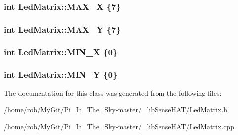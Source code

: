 \subsubsection[{\texorpdfstring{M\+A\+X\+\_\+X}{MAX_X}}]{ int Led\+Matrix\+::\+M\+A\+X\+\_\+X \{7\}\hspace{0.3cm}{\ttfamily [static]}}\hypertarget{class_led_matrix_a6da341535a246a5395b0a46569618830}{}\label{class_led_matrix_a6da341535a246a5395b0a46569618830}
\subsubsection[{\texorpdfstring{M\+A\+X\+\_\+Y}{MAX_Y}}]{ int Led\+Matrix\+::\+M\+A\+X\+\_\+Y \{7\}\hspace{0.3cm}{\ttfamily [static]}}\hypertarget{class_led_matrix_aa6cf03e172a1efe233aaac293be202bd}{}\label{class_led_matrix_aa6cf03e172a1efe233aaac293be202bd}
\subsubsection[{\texorpdfstring{M\+I\+N\+\_\+X}{MIN_X}}]{ int Led\+Matrix\+::\+M\+I\+N\+\_\+X \{0\}\hspace{0.3cm}{\ttfamily [static]}}\hypertarget{class_led_matrix_a30e3af90d4c9a83aec44e71914f86aa3}{}\label{class_led_matrix_a30e3af90d4c9a83aec44e71914f86aa3}
\subsubsection[{\texorpdfstring{M\+I\+N\+\_\+Y}{MIN_Y}}]{ int Led\+Matrix\+::\+M\+I\+N\+\_\+Y \{0\}\hspace{0.3cm}{\ttfamily [static]}}\hypertarget{class_led_matrix_a4bb052cfec297bc54387decb20a0f17f}{}\label{class_led_matrix_a4bb052cfec297bc54387decb20a0f17f}


The documentation for this class was generated from the following files\+:\begin{DoxyCompactItemize}
\item 
/home/rob/\+My\+Git/\+Pi\+\_\+\+In\+\_\+\+The\+\_\+\+Sky-\/master/\+\_\+lib\+Sense\+H\+A\+T/\hyperlink{_led_matrix_8h}{Led\+Matrix.\+h}\item 
/home/rob/\+My\+Git/\+Pi\+\_\+\+In\+\_\+\+The\+\_\+\+Sky-\/master/\+\_\+lib\+Sense\+H\+A\+T/\hyperlink{_led_matrix_8cpp}{Led\+Matrix.\+cpp}\end{DoxyCompactItemize}
